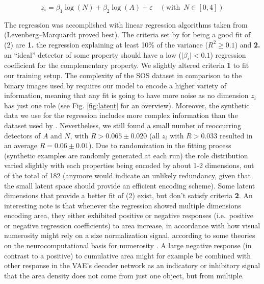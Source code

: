 \documentclass[twocolumn]{article}
\begin{document}
\[z_i = \beta_1 \log(N) + \beta_2\log(A) + \varepsilon \quad (\textrm{with }\, N \in [0, 4]) \tag{2} \]

\noindent The regression was accomplished with linear regression algorithms taken
from \citet{newville2016lmfit} (Levenberg--Marquardt proved best). The
criteria set by \citet{stoianov2012} for being a good fit of (2)
are \textbf{1.} the regression explaining at least 10\% of the variance
(\(R^2 \geq 0.1\)) and \textbf{2.}  an ``ideal'' detector of some
property should have a low (\(\mid\beta_i\mid < 0.1\)) regression
coefficient for the complementary property. We slightly altered criteria
\textbf{1} to fit our training setup. The complexity of the SOS
dataset in comparison to the binary images used by \citet{stoianov2012}
requires our model to encode a higher variety of information, meaning
that any fit is going to have more noise as no dimension \(z_i\) has just one
role (see Fig. \ref{fig:latent} for an overview). Moreover, the synthetic data we
use for the regression includes more complex information than the
dataset used by \citet{stoianov2012}. Nevertheless, we still found a
small number of reoccurring detectors of \(A\) and \(N\), with
\(R > 0.065 \pm 0.020\) (all \(z_i\) with \(R > 0.033\) resulted in an
average \(R= 0.06 \pm 0.01\)). Due to randomization in the fitting
process (synthetic examples are randomly generated at each run) the role
distribution varied slightly with each properties being encoded by about
1-2 dimensions, out of the total of 182 (anymore would indicate an
unlikely redundancy, given that the small latent space should provide an
efficient encoding scheme). Some latent dimensions that provide a better
fit of (2) exist, but don't satisfy criteria \textbf{2}. An
interesting note is that whenever the regression showed multiple
dimensions encoding area, they either exhibited positive or negative
responses (i.e.~positive or negative regression coefficients) to area
increase, in accordance with how visual numerosity might rely on a size
normalization signal, according to some theories on the
neurocomputational basis for numerosity \citep[see][ for a
discussion]{stoianov2012}. A large negative response (in contrast to a
positive) to cumulative area might for example be combined with other
response in the VAE's decoder network as an indicatory or inhibitory
signal that the area density does not come from just one object, but
from multiple.
\end{document}
